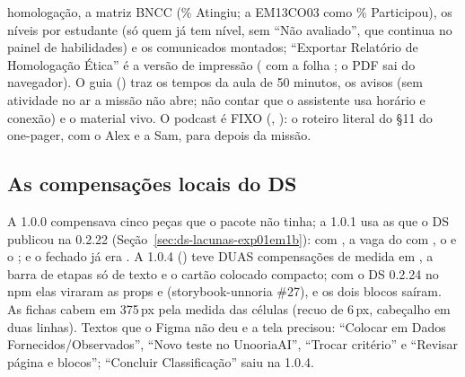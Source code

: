 homologação, a matriz BNCC (\% Atingiu; a EM13CO03 como \% Participou), os
níveis por estudante (só quem já tem nível, sem \enquote{Não avaliado}, que
continua no painel de habilidades) e os comunicados montados; \enquote{Exportar Relatório de Homologação Ética} é
a versão de impressão ( com a folha
; o PDF sai do navegador). O guia
() traz os tempos da aula de 50
minutos, os avisos (sem atividade no ar a missão não abre; não contar que o
assistente usa horário e conexão) e o material vivo. O podcast é FIXO
(, ): o roteiro literal do \S{}11 do
one-pager, com o Alex e a Sam, para depois da missão.

\subsection{As compensações locais do DS}

A 1.0.0 compensava cinco peças que o pacote não tinha; a 1.0.1 usa as que o
DS publicou na 0.2.22 (Seção~\ref{sec:ds-lacunas-exp01em1b}): 
com , a vaga do  com , o
 e o ; e o  fechado já era
. A 1.0.4 () teve DUAS compensações de medida em
, a barra de etapas só de texto e o cartão colocado
compacto; com o DS 0.2.24 no npm elas viraram as props  e 
(storybook-unnoria \#27), e os dois blocos saíram. As fichas cabem em 375\,px pela medida das células (recuo de
6\,px, cabeçalho em duas linhas). Textos que o Figma não deu e a tela
precisou: \enquote{Colocar em Dados Fornecidos/Observados}, \enquote{Novo
teste no UnooriaAI}, \enquote{Trocar critério} e \enquote{Revisar página e
blocos}; \enquote{Concluir Classificação} saiu na 1.0.4.

